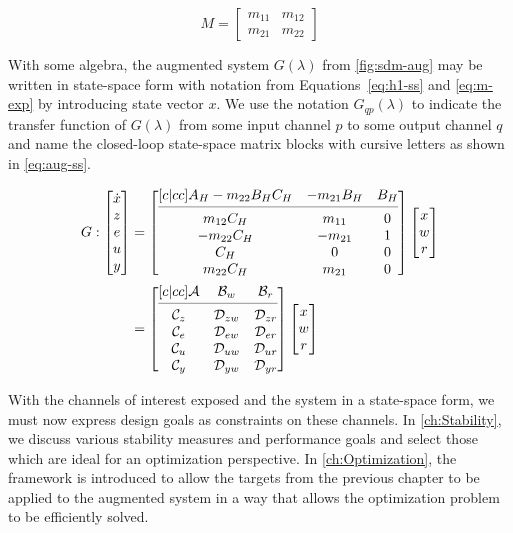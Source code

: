 \begin{equation}
	M = 
	\begin{bmatrix}
		m_{11} & m_{12} \\
		m_{21} & m_{22}
	\end{bmatrix} \label{eq:m-exp}
\end{equation}

With some algebra, the augmented system $G(\lambda)$ from \autoref{fig:sdm-aug} may be written in state-space form with notation from Equations~\ref{eq:h1-ss} and \ref{eq:m-exp} by introducing state vector $x$. We use the notation $G_{qp}(\lambda)$ to indicate the transfer function of $G(\lambda)$ from some input channel $p$ to some output channel $q$ and name the closed-loop state-space matrix blocks with cursive letters as shown in \autoref{eq:aug-ss}.

\begin{align}
	G:
	\begin{bmatrix}
		\dot{x} \\
		z \\
		e \\
		u \\
		y
	\end{bmatrix} &=
	\begin{bmatrix}[c|cc]
		A_H - m_{22}B_HC_H & -m_{21}B_H & B_H \\
		\cmidrule(lr){1-3}
		m_{12}C_H & m_{11} & 0 \\
		-m_{22}C_H & -m_{21} & 1 \\
		C_H & 0 & 0 \\
		m_{22}C_H & m_{21} & 0
	\end{bmatrix}
	\begin{bmatrix}
		x \\
		w \\
		r
	\end{bmatrix} \label{eq:aug} \\
	&=
	\begin{bmatrix}[c|cc]
		\mathcal{A} & \mathcal{B}_w & \mathcal{B}_r \\
		\cmidrule(lr){1-3}
		\mathcal{C}_z & \mathcal{D}_{zw} & \mathcal{D}_{zr} \\
		\mathcal{C}_e & \mathcal{D}_{ew} & \mathcal{D}_{er} \\
		\mathcal{C}_u & \mathcal{D}_{uw} & \mathcal{D}_{ur} \\
		\mathcal{C}_y & \mathcal{D}_{yw} & \mathcal{D}_{yr}
	\end{bmatrix}
	\begin{bmatrix}
		x \\
		w \\
		r
	\end{bmatrix} \label{eq:aug-ss}
\end{align}

With the channels of interest exposed and the system in a state-space form, we must now express design goals as constraints on these channels. In \autoref{ch:Stability}, we discuss various stability measures and performance goals and select those which are ideal for an optimization perspective. In \autoref{ch:Optimization}, the framework is introduced to allow the targets from the previous chapter to be applied to the augmented system in a way that allows the optimization problem to be efficiently solved.